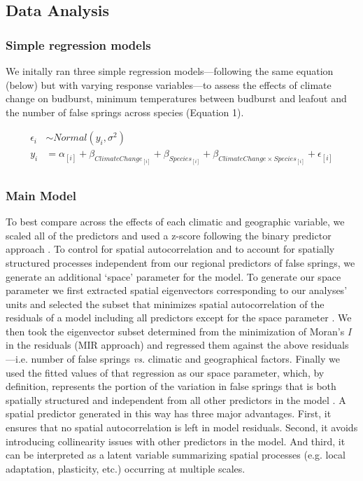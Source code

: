 \documentclass{article}\usepackage[]{graphicx}\usepackage[]{color}
\begin{document}
\subsection*{Data Analysis} 
\subsubsection*{Simple regression models}
We initally ran three simple regression models---following the same equation (below) but with varying response variables---to assess the effects of climate change on budburst, minimum temperatures between budburst and leafout and the number of false springs across species (Equation 1).

\begin{align*}
\epsilon_i & \sim Normal(y_i ,  \sigma^{2}) \tag{1}\\
y_i &= \alpha_{[i]} + \beta_{ClimateChange_{[i]}} + \beta_{Species_{[i]}} + \beta_{ClimateChange \times Species_{[i]}} + \epsilon_{[i]} \nonumber\\
\end{align*}

\subsubsection*{Main Model}
To best compare across the effects of each climatic and geographic variable, we scaled all of the predictors and used a z-score following the binary predictor approach \citep{Gelman2006}. To control for spatial autocorrelation and to account for spatially structured processes independent from our regional predictors of false springs, we generate an additional `space' parameter for the model. To generate our space parameter we first extracted spatial eigenvectors corresponding to our analyses' units and selected the subset that minimizes spatial autocorrelation of the residuals of a model including all predictors except for the space parameter \citep[][, see supplemental materials `Methods: Spatial parameter' for more details]{Baumen2017,diniz2012selection}. We then took the eigenvector subset determined from the minimization of Moran's \textit{I} in the residuals (MIR approach) and regressed them against the above residuals---i.e. number of false springs \emph{vs.} climatic and geographical factors. Finally we used the fitted values of that regression as our space parameter, which, by definition, represents the portion of the variation in false springs that is both spatially structured and independent from all other predictors in the model \citep[e.g. average spring temperature, elevation, etc.][]{griffith2006spatial,morales2012imprint}. A spatial predictor generated in this way has three major advantages. First, it ensures that no spatial autocorrelation is left in model residuals. Second, it avoids introducing collinearity issues with other predictors in the model. And third, it can be interpreted as a latent variable summarizing spatial processes (e.g. local adaptation, plasticity, etc.) occurring at multiple scales.
\end{document}
